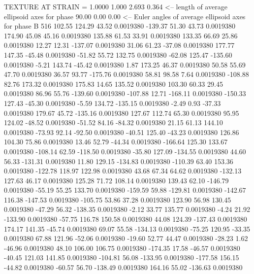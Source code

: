 TEXTURE AT STRAIN =    1.0000
   1.000   2.693   0.364  <-- length of average ellipsoid axes for phase
   90.00    0.00    0.00  <-- Euler angles of average ellipsoid axes for phase
B       516
  102.55  124.29   43.52   0.0019380
 -139.37   51.30   43.73   0.0019380
  174.90   45.08   45.16   0.0019380
  135.88   61.53   33.91   0.0019380
  133.35   66.69   25.86   0.0019380
   12.27   12.31 -137.07   0.0019380
   31.06   61.23  -37.08   0.0019380
  177.77  147.35  -45.48   0.0019380
  -51.82   55.72  132.75   0.0019380
  -62.08  125.47 -135.60   0.0019380
   -5.21  143.74  -45.42   0.0019380
    1.87  173.25   46.37   0.0019380
   50.58   55.69   47.70   0.0019380
   36.57   93.77 -175.76   0.0019380
   58.81   98.58    7.64   0.0019380
 -108.88   82.76  173.32   0.0019380
  175.83   14.65  135.52   0.0019380
  103.30   60.33   29.45   0.0019380
   86.96   55.76 -139.60   0.0019380
 -107.88   12.71 -168.11   0.0019380
 -150.33  127.43  -45.30   0.0019380
   -5.59  134.72 -135.15   0.0019380
   -2.49    0.93  -37.33   0.0019380
  179.67   45.72 -135.16   0.0019380
  127.67  112.74   65.30   0.0019380
   95.95  124.02  -48.52   0.0019380
  -51.52   84.16  -84.32   0.0019380
   21.15   61.13  144.10   0.0019380
  -73.93   92.14  -92.50   0.0019380
  -40.51  125.40  -43.23   0.0019380
  126.86  104.30   75.86   0.0019380
   13.46   52.79  -44.34   0.0019380
 -166.64  125.30  133.67   0.0019380
 -108.14   62.59 -118.50   0.0019380
  -35.80  127.09 -134.55   0.0019380
   44.60   56.33 -131.31   0.0019380
   11.80  129.15 -134.83   0.0019380
 -110.39   63.40  153.36   0.0019380
 -122.78  118.97  122.98   0.0019380
   43.68   67.34   64.62   0.0019380
 -132.13  127.63   46.17   0.0019380
  125.28   71.72  108.14   0.0019380
  139.43   62.10 -146.79   0.0019380
  -55.19   55.25  133.70   0.0019380
 -159.59   59.88 -129.81   0.0019380
 -142.67  116.38 -147.53   0.0019380
 -105.75   53.86   37.28   0.0019380
  123.90   56.98  130.45   0.0019380
  -47.29   56.32 -138.35   0.0019380
   -2.12   33.77  135.77   0.0019380
   -4.24   21.92 -133.90   0.0019380
  -57.75  116.78  150.58   0.0019380
   44.08  124.39 -137.43   0.0019380
  174.17  141.35  -45.74   0.0019380
   69.07   55.58 -134.13   0.0019380
  -75.25  120.95  -33.35   0.0019380
   67.88  121.96  -52.06   0.0019380
  -19.60   52.77   44.47   0.0019380
  -28.23    1.62  -46.96   0.0019380
   48.10  106.00  106.75   0.0019380
 -174.35   17.58  -46.57   0.0019380
  -40.45  121.03  141.85   0.0019380
 -104.81   56.08 -133.95   0.0019380
 -177.58  156.15  -44.82   0.0019380
  -60.57   56.70 -138.49   0.0019380
  164.16   55.02 -136.63   0.0019380
